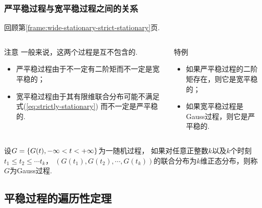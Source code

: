 \begin{frame}
    \frametitle{严平稳过程与宽平稳过程之间的关系}
    回顾第\ref{frame:wide-stationary-strict-stationary}页. 
    \begin{columns}
        \begin{column}{.6\columnwidth}
            \begin{alertblock}{注意}
                一般来说，这两个过程是互不包含的.
                \begin{itemize}
                    \item 严平稳过程由于不一定有二阶矩而不一定是宽平稳的；
                    \item 宽平稳过程由于其有限维联合分布可能不满足式(\ref{eq:strictly-stationary})
                            而不一定是严平稳的. 
                \end{itemize}
            \end{alertblock}    
        \end{column}
        \begin{column}{.3\columnwidth}
            \begin{exampleblock}{特例}
                \begin{itemize}
                    \item 如果严平稳过程的二阶矩存在，则它是宽平稳的；
                    \item 如果宽平稳过程是Gauss过程，则它是严平稳的. 
                \end{itemize}
            \end{exampleblock}  
        \end{column}        
    \end{columns}

    \begin{mydefinition}[Gauss过程]
        设$G=\left\{G(t),-\infty<t<+\infty\right\}$为一随机过程，
        如果对任意正整数$k$以及$k$个时刻$t_1\leqslant t_2\leqslant \cdots t_k$，
        $(G(t_1), G(t_2),\cdots, G(t_k))$的联合分布为$k$维正态分布，则称$G$为Gauss过程. 
    \end{mydefinition}

\end{frame}

\subsection{平稳过程的遍历性定理}

